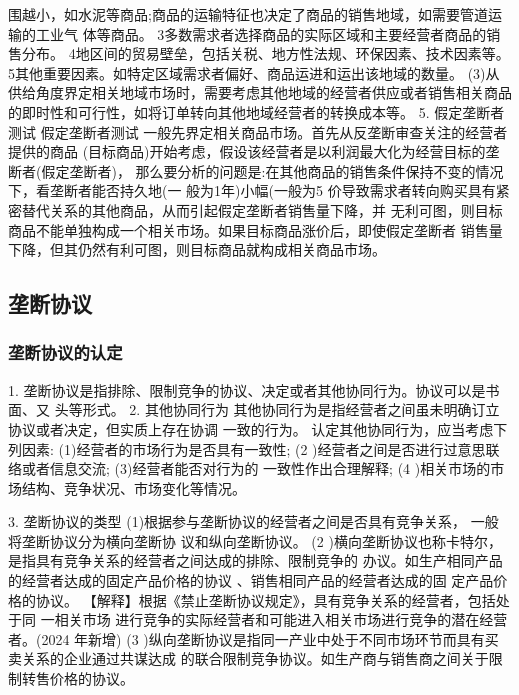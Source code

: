 \documentclass[UTF8,12pt]{ctexart}
\numberwithin{equation}{section} %
\numberwithin{figure}{section}
\numberwithin{table}{section}
\begin{document}
	
	围越小，如水泥等商品;商品的运输特征也决定了商品的销售地域，如需要管道运输的工业气
	体等商品。
	3多数需求者选择商品的实际区域和主要经营者商品的销售分布。
	4地区间的贸易壁垒，包括关税、地方性法规、环保因素、技术因素等。
	5其他重要因素。如特定区域需求者偏好、商品运进和运出该地域的数量。
	(3)从供给角度界定相关地域市场时，需要考虑其他地域的经营者供应或者销售相关商品
	的即时性和可行性，如将订单转向其他地域经营者的转换成本等。
	5. 假定垄断者测试
	假定垄断者测试 一般先界定相关商品市场。首先从反垄断审查关注的经营者提供的商品
	(目标商品)开始考虑，假设该经营者是以利润最大化为经营目标的垄断者(假定垄断者)，
	那么要分析的问题是:在其他商品的销售条件保持不变的情况下，看垄断者能否持久地(一
	般为1年)小幅(一般为5%
	价导致需求者转向购买具有紧密替代关系的其他商品，从而引起假定垄断者销售量下降，并
	无利可图，则目标商品不能单独构成一个相关市场。如果目标商品涨价后，即使假定垄断者
	销售量下降，但其仍然有利可图，则目标商品就构成相关商品市场。
	
	\subsection{垄断协议}
	
	\subsubsection{垄断协议的认定}
	1. 垄断协议是指排除、限制竞争的协议、决定或者其他协同行为。协议可以是书面、又
	头等形式。
	2. 其他协同行为
	其他协同行为是指经营者之间虽未明确订立协议或者决定，但实质上存在协调 一致的行为。
	认定其他协同行为，应当考虑下列因素:
	(1)经营者的市场行为是否具有一致性;
	(2 )经营者之间是否进行过意思联络或者信息交流;
	(3)经营者能否对行为的 一致性作出合理解释;
	(4 )相关市场的市场结构、竞争状况、市场变化等情况。
	
	3. 垄断协议的类型
	(1)根据参与垄断协议的经营者之间是否具有竞争关系， 一般将垄断协议分为横向垄断协
	议和纵向垄断协议。
	(2 )横向垄断协议也称卡特尔， 是指具有竞争关系的经营者之间达成的排除、限制竞争的
	办议。如生产相同产品的经营者达成的固定产品价格的协议 、销售相同产品的经营者达成的固
	定产品价格的协议。
	【解释】根据《禁止垄断协议规定》，具有竞争关系的经营者，包括处于同 一相关市场
	进行竞争的实际经营者和可能进入相关市场进行竞争的潜在经营者。(2024 年新增)
	(3 )纵向垄断协议是指同一产业中处于不同市场环节而具有买卖关系的企业通过共谋达成
	的联合限制竞争协议。如生产商与销售商之间关于限制转售价格的协议。
	
\end{document}

